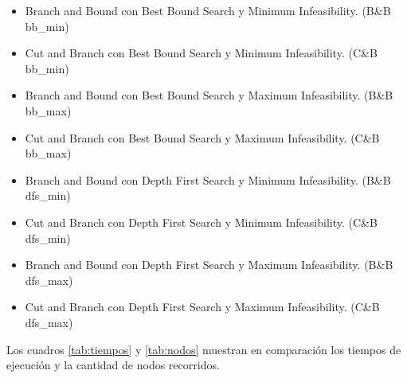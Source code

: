 \documentclass[a4paper]{article}
\begin{document}
\begin{itemize}
	\item Branch and Bound con Best Bound Search y Minimum Infeasibility. (B\&B bb_min)
	\item Cut and Branch con Best Bound Search y Minimum Infeasibility. (C\&B bb_min)
	\item Branch and Bound con Best Bound Search y Maximum Infeasibility. (B\&B bb_max)
	\item Cut and Branch con Best Bound Search y Maximum Infeasibility. (C\&B bb_max)
	\item Branch and Bound con Depth First Search y Minimum Infeasibility. (B\&B dfs_min)
	\item Cut and Branch con Depth First Search y Minimum Infeasibility. (C\&B dfs_min)
	\item Branch and Bound con Depth First Search y Maximum Infeasibility. (B\&B dfs_max)
	\item Cut and Branch con Depth First Search y Maximum Infeasibility. (C\&B dfs_max)
\end{itemize}

Los cuadros \ref{tab:tiempos} y \ref{tab:nodos} muestran en comparación los tiempos de ejecución y la cantidad de nodos recorridos.
\end{document}
